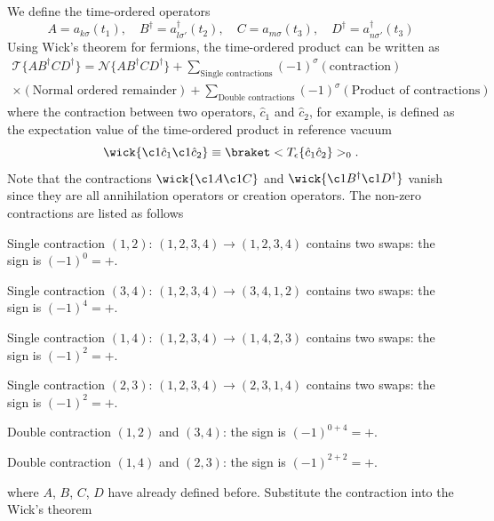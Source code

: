 \begin{solution}\leavevmode
  \begin{enumext}
    \item We define the time-ordered operators
    \[
      A = a_{k\sigma}(t_1), \quad
      B^\dagger = a_{l\sigma'}^\dagger(t_2), \quad
      C = a_{m\sigma}(t_3),\quad
      D^\dagger = a_{n\sigma'}^\dagger(t_3)
    \]
    Using Wick's theorem for fermions, the time-ordered product can be
    written as
    \begin{multline*}
      \mathcal T\{AB^\dagger CD^\dagger\}
  = \mathcal N\{AB^\dagger CD^\dagger\} +
        \sum_\text{Single contractions}
        (-1)^\sigma (\text{contraction}) \\
        \times (\text{Normal ordered remainder})
      + \sum_\text{Double contractions} (-1)^\sigma
        (\text{Product of contractions})
    \end{multline*}
    where the contraction between two operators, $\hat c_1$ and $\hat c_2$,
    for example, is defined as the expectation value of the time-ordered product
    in reference vacuum
    \[
      \wick{\c1{\hat c}_1\c1{\hat c}_2}
        \equiv \braket<T_\epsilon\{\hat c_1\hat c_2\}>_0.
    \]
    Note that the contractions $\wick{\c1A\c1C}$
    and $\wick{\c1B^\dagger\c1D^\dagger}$ vanish
    since they are all annihilation operators or creation operators.
    The non-zero contractions are listed as follows
    \begin{enumext}
      \item Single contraction $(1,2)$:
      $(1,2,3,4) \to (1,2,3,4)$ contains two swaps: the sign is $(-1)^0 = +$.
      \item Single contraction $(3,4)$:
      $(1,2,3,4) \to (3,4,1,2)$ contains two swaps: the sign is $(-1)^4 = +$.
      \item Single contraction $(1,4)$:
      $(1,2,3,4) \to (1,4,2,3)$ contains two swaps: the sign is $(-1)^2 = +$.
      \item Single contraction $(2,3)$:
      $(1,2,3,4) \to (2,3,1,4)$ contains two swaps: the sign is $(-1)^2 = +$.
      \item Double contraction $(1,2)$ and $(3,4)$:
      the sign is $(-1)^{0+4} = +$.
      \item Double contraction $(1,4)$ and $(2,3)$:
      the sign is $(-1)^{2+2} = +$.
    \end{enumext}
    where $A$, $B$, $C$, $D$ have already defined before.
    Substitute the contraction into the Wick's theorem
    \begin{multline*}

\end{multline*}
\end{enumext}
\end{solution}
